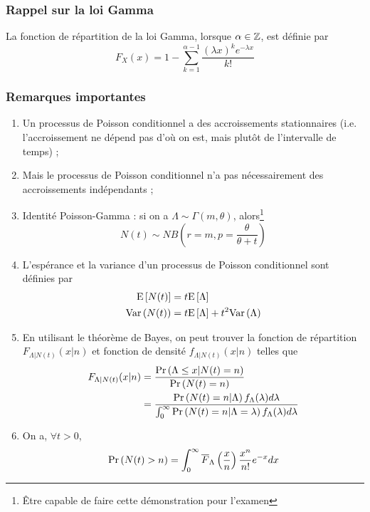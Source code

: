 \documentclass[10pt, french, landscape]{article}
\begin{document}
\begin{multicols*}{3}
\subsubsection*{Rappel sur la loi Gamma}
La fonction de répartition de la loi Gamma, lorsque $\alpha \in \mathbb{Z}$, est définie par
\[F_X(x) = 1 - \sum_{k=1}^{\alpha-1} \frac{(\lambda x)^k e^{-\lambda x}}{k!}\]


\subsubsection*{Remarques importantes}
\begin{enumerate}[label=(\arabic*)]
\item Un processus de Poisson conditionnel a des accroissements stationnaires (i.e. l'accroissement ne dépend pas d'où on est, mais plutôt de l'intervalle de temps) ; 
\item Mais le processus de Poisson conditionnel n'a pas nécessairement des accroissements indépendants ;
\item Identité Poisson-Gamma : si on a $\Lambda \sim \Gamma(m, \theta)$, alors\footnote{Être capable de faire cette démonstration pour l'examen}
\[N(t) \sim NB\left(r = m, p = \frac{\theta}{\theta + t} \right) \]

\item L'espérance et la variance d'un processus de Poisson conditionnel sont définies par
\begin{align*}
\mathrm{E} \left[ N(t) \right] & = t \mathrm{E} \left[ \Lambda \right] \\
\mathrm{Var} \left( N(t) \right) & =  t \mathrm{E} \left[ \Lambda \right] + t^2 \mathrm{Var} \left( \Lambda \right)
\end{align*}

\item En utilisant le théorème de Bayes, on peut trouver la fonction de répartition $F_{\Lambda | N(t)}(x | n)$ et fonction de densité $f_{\Lambda | N(t)}(x | n)$ telles que
\begin{align*}
F_{\Lambda | N(t)}(x | n)	& = \frac{\Pr \left( \Lambda \leq x | N(t) = n \right)}{\Pr \left( N(t) = n \right)} \\
& = \frac{\Pr \left( N(t) = n | \Lambda \right) f_\Lambda(\lambda) d \lambda}{\int_{0}^{\infty} \Pr \left( N(t) = n | \Lambda = \lambda \right) f_\Lambda(\lambda) d\lambda} \\
\end{align*}

\item On a, $\forall t > 0$,
\begin{align*}
\Pr \left( N(t) > n \right) = \int_{0}^{\infty} \overline{F}_{\Lambda}\left( \frac{x}{n} \right) \frac{x^n}{n!} e^{-x} dx
\end{align*}
\end{enumerate}


\end{multicols*}
\end{document}
